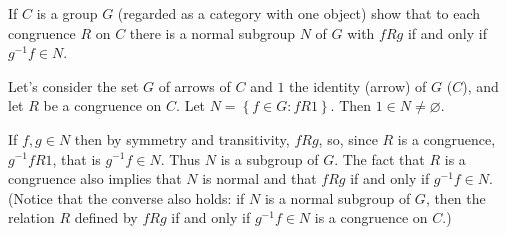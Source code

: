 \begin{exercise}
If $C$ is a group $G$ (regarded as a category with one object) show that to each congruence $R$ on $C$ there is a normal subgroup $N$ of $G$ with $fRg$ if and only if $g^{-1}f\in N$.
\end{exercise}
\begin{solution}
Let's consider the set $G$ of arrows of $C$ and $1$ the identity (arrow) of $G$ ($C$), and let $R$ be a congruence on $C$. Let $N=\left\{f\in G:fR1\right\}$. Then $1\in N\neq\varnothing$.

If $f,g\in N$ then by symmetry and transitivity, $fRg$, so, since $R$ is a congruence, $g^{-1}fR1$, that is $g^{-1}f\in N$. Thus $N$ is a subgroup of $G$. The fact that $R$ is a congruence also implies that $N$ is normal and that $fRg$ if and only if $g^{-1}f\in N$. (Notice that the converse also holds: if $N$ is a normal subgroup of $G$, then the relation $R$ defined by $fRg$ if and only if $g^{-1}f\in N$ is a congruence on $C$.)
\end{solution}

